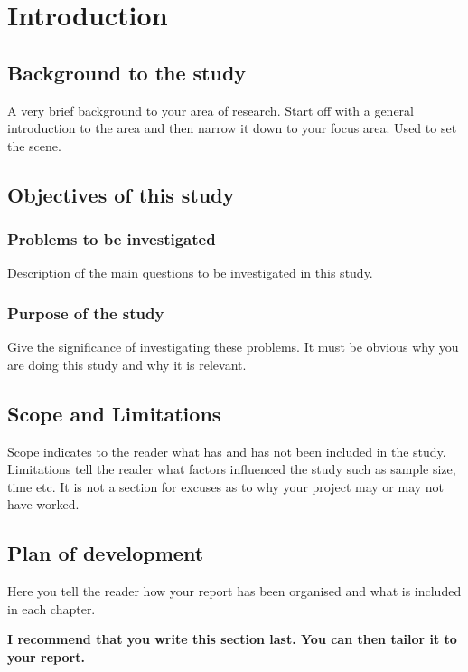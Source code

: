 \chapter{Introduction}

\section{Background to the study}
A very brief background to your area of research. Start off with a general introduction to the area and
then narrow it down to your focus area. Used to set the scene\cite{smt2011}.
\section{Objectives of this study}
\subsection{Problems to be investigated}
Description of the main questions to be investigated in this study.
\subsection{Purpose of the study}
Give the significance of investigating these problems. It must be obvious why you are doing this study
and why it is relevant.

\section{Scope and Limitations}
Scope indicates to the reader what has and has not been included in the study. Limitations tell the
reader what factors influenced the study such as sample size, time etc. It is not a section for excuses as
to why your project may or may not have worked.

\section{Plan of development}
Here you tell the reader how your report has been organised and what is included in each
chapter.

{\bf I recommend that you write this section last. You can then tailor it to your report.}
